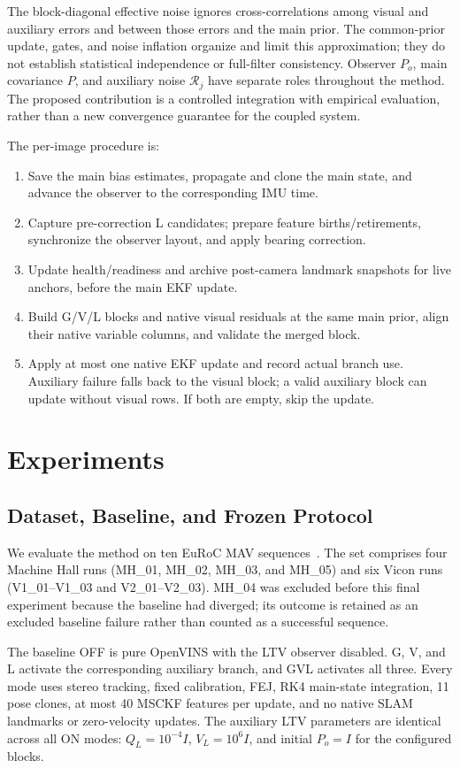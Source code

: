 \documentclass[a4paper,runningheads,twocolumn]{llncs}
\begin{document}
The block-diagonal effective noise ignores cross-correlations among visual and auxiliary errors and between those errors and the main prior. The common-prior update, gates, and noise inflation organize and limit this approximation; they do not establish statistical independence or full-filter consistency. Observer $P_o$, main covariance $P$, and auxiliary noise $\mathcal R_j$ have separate roles throughout the method. The proposed contribution is a controlled integration with empirical evaluation, rather than a new convergence guarantee for the coupled system.

The per-image procedure is:
\begin{enumerate}
\item Save the main bias estimates, propagate and clone the main state, and advance the observer to the corresponding IMU time.
\item Capture pre-correction L candidates; prepare feature births/retirements, synchronize the observer layout, and apply bearing correction.
\item Update health/readiness and archive post-camera landmark snapshots for live anchors, before the main EKF update.
\item Build G/V/L blocks and native visual residuals at the same main prior, align their native variable columns, and validate the merged block.
\item Apply at most one native EKF update and record actual branch use. Auxiliary failure falls back to the visual block; a valid auxiliary block can update without visual rows. If both are empty, skip the update.
\end{enumerate}

\section{Experiments}
\subsection{Dataset, Baseline, and Frozen Protocol}
We evaluate the method on ten EuRoC MAV sequences~\cite{burri2016}. The set comprises four Machine Hall runs (MH\_01, MH\_02, MH\_03, and MH\_05) and six Vicon runs (V1\_01--V1\_03 and V2\_01--V2\_03). MH\_04 was excluded before this final experiment because the baseline had diverged; its outcome is retained as an excluded baseline failure rather than counted as a successful sequence.

The baseline OFF is pure OpenVINS with the LTV observer disabled. G, V, and L activate the corresponding auxiliary branch, and GVL activates all three. Every mode uses stereo tracking, fixed calibration, FEJ, RK4 main-state integration, 11 pose clones, at most 40 MSCKF features per update, and no native SLAM landmarks or zero-velocity updates. The auxiliary LTV parameters are identical across all ON modes: $Q_L=10^{-4}I$, $V_L=10^6I$, and initial $P_o=I$ for the configured blocks.
\end{document}
